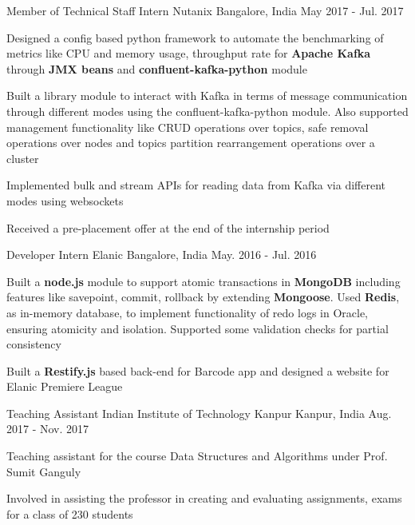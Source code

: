 \begin{cventries}
  \cventry
    {Member of Technical Staff Intern}
    {Nutanix}
    {Bangalore, India}
    {May 2017 - Jul. 2017}
    {
      \begin{cvitems}
      \item {Designed a config based python framework to automate the benchmarking of metrics like CPU and memory usage, throughput rate for \textbf{Apache Kafka} through \textbf{JMX beans} and \textbf{confluent-kafka-python} module}
        \item {Built a library module to interact with Kafka in terms of message communication through different modes using the confluent-kafka-python module. Also supported management functionality like CRUD operations over topics, safe removal operations over nodes and topics partition rearrangement operations over a cluster}
        \item {Implemented bulk and stream APIs for reading data from Kafka via different modes using websockets}
        \item {Received a pre-placement offer at the end of the internship period}
      \end{cvitems}
    }
  \cventry
    {Developer Intern}
    {Elanic}
    {Bangalore, India}
    {May. 2016 - Jul. 2016}
    {
      \begin{cvitems}
      \item {Built a \textbf{node.js} module to support atomic transactions in \textbf{MongoDB} including features like savepoint, commit, rollback by extending \textbf{Mongoose}. Used \textbf{Redis}, as in-memory database, to implement functionality of redo logs in Oracle, ensuring atomicity and isolation. Supported some validation checks for partial consistency}
      \item {Built a \textbf{Restify.js} based back-end for Barcode app and designed a website for Elanic Premiere League}
      \end{cvitems}
    }
  \cventry
    {Teaching Assistant}
    {Indian Institute of Technology Kanpur}
    {Kanpur, India}
    {Aug. 2017 - Nov. 2017}
    {
      \begin{cvitems}
        \item {Teaching assistant for the course Data Structures and Algorithms under Prof. Sumit Ganguly}
        \item {Involved in assisting the professor in creating and evaluating assignments, exams for a class of 230 students}
      \end{cvitems} 
    }
\end{cventries}
